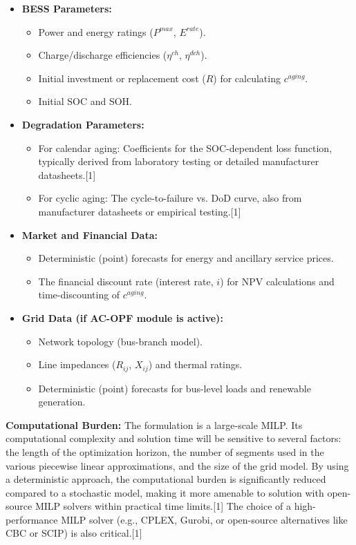 \begin{itemize}
    \item \textbf{BESS Parameters:}
    \begin{itemize}
        \item Power and energy ratings ($P^{max}$, $E^{rate}$).
        \item Charge/discharge efficiencies ($\eta^{ch}$, $\eta^{dch}$).
        \item Initial investment or replacement cost ($R$) for calculating $c^{aging}$.
        \item Initial SOC and SOH.
    \end{itemize}
    \item \textbf{Degradation Parameters:}
    \begin{itemize}
        \item For calendar aging: Coefficients for the SOC-dependent loss function, typically derived from laboratory testing or detailed manufacturer datasheets.[1]
        \item For cyclic aging: The cycle-to-failure vs. DoD curve, also from manufacturer datasheets or empirical testing.[1]
    \end{itemize}
    \item \textbf{Market and Financial Data:}
    \begin{itemize}
        \item Deterministic (point) forecasts for energy and ancillary service prices.
        \item The financial discount rate (interest rate, $i$) for NPV calculations and time-discounting of $c^{aging}$.
    \end{itemize}
    \item \textbf{Grid Data (if AC-OPF module is active):}
    \begin{itemize}
        \item Network topology (bus-branch model).
        \item Line impedances ($R_{ij}$, $X_{ij}$) and thermal ratings.
        \item Deterministic (point) forecasts for bus-level loads and renewable generation.
    \end{itemize}
\end{itemize}

\textbf{Computational Burden:} The formulation is a large-scale MILP. Its computational complexity and solution time will be sensitive to several factors: the length of the optimization horizon, the number of segments used in the various piecewise linear approximations, and the size of the grid model. By using a deterministic approach, the computational burden is significantly reduced compared to a stochastic model, making it more amenable to solution with open-source MILP solvers within practical time limits.[1] The choice of a high-performance MILP solver (e.g., CPLEX, Gurobi, or open-source alternatives like CBC or SCIP) is also critical.[1]

